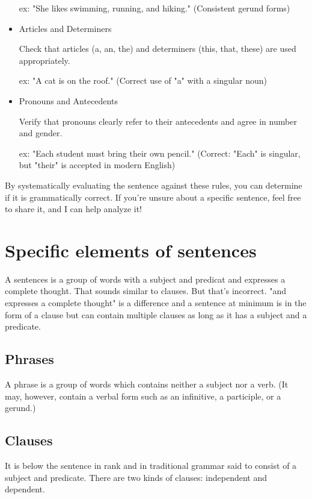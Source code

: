 \documentclass{book}
\begin{document}
\begin{itemize}
	      ex: "She likes swimming, running, and hiking." (Consistent gerund forms)
	\item Articles and Determiners
	      
	      Check that articles (a, an, the) and determiners (this, that, these) are used appropriately.
	      
	      ex: "A cat is on the roof." (Correct use of "a" with a singular noun)
	\item Pronouns and Antecedents
	      
	      Verify that pronouns clearly refer to their antecedents and agree in number and gender.
	      
	      ex: "Each student must bring their own pencil." (Correct: "Each" is singular, but "their" is accepted in modern English)
\end{itemize}

By systematically evaluating the sentence against these rules, you can determine if it is grammatically correct. If you're unsure about a specific sentence, feel free to share it, and I can help analyze it!

\chapter{Specific elements of sentences}

A sentences is a group of words with a subject and predicat and expresses a complete thought. That sounds similar to clauses. But that's incorrect. "and expresses a complete thought" is a difference and a sentence at minimum is in the form of a clause but can contain multiple clauses as long as it has a subject and a predicate.

\section{Phrases}

A phrase is a group of words which contains neither a subject nor a verb. (It may, however, contain a verbal form such as an infinitive, a participle, or a gerund.)

\section{Clauses}

It is below the sentence in rank and in traditional grammar said to consist of a subject and predicate. There are two kinds of clauses: independent and dependent.
\end{document}
